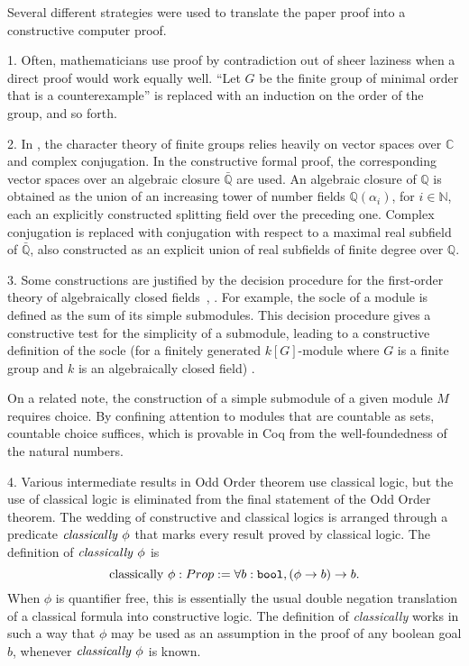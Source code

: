 \documentclass[brochure,english,12pt]{bourbaki}
\theoremstyle{plain}
\def\op#1{{\operatorname{#1}}}
\def\ring#1{{\mathbb{#1}}}
\def\bool{\op{\tt bool}}
\begin{document}
Several different strategies were used to translate the paper proof
into a constructive computer proof.

1.  Often, mathematicians use proof by contradiction out of sheer
laziness when a direct proof would work equally well.  ``Let $G$ be
the finite group of minimal order that is a counterexample'' is
replaced with an induction on the order of the group, and so forth.

2. In \cite{peterfalvi2000character}, the character theory of finite
groups relies heavily on vector spaces over $\ring{C}$ and complex
conjugation.  In the constructive formal proof, the corresponding
vector spaces over an algebraic closure $\bar{\ring{Q}}$ are used.  An
algebraic closure of $\ring{Q}$ is obtained as the union of an
increasing tower of number fields $\ring{Q}(\alpha_i)$, for
$i\in\ring{N}$, each an explicitly constructed splitting field over
the preceding one.  Complex conjugation is replaced with conjugation
with respect to a maximal real subfield of $\bar{\ring{Q}}$, also
constructed as an explicit union of real subfields of finite degree
over $\ring{Q}$.

3.  Some constructions are justified by the decision procedure for the
first-order theory of algebraically closed
fields~\cite{cohen2010formal}, \cite{Ha09}.  For example, the socle of
a module is defined as the sum of its simple submodules.  This
decision procedure gives a constructive test for the simplicity of a
submodule, leading to a constructive definition of the socle (for a
finitely generated $k[G]$-module where $G$ is a finite group and $k$
is an algebraically closed field) \cite{gonthier2011point}.

On a related note, the construction of a simple submodule of a given
module $M$ requires choice.  By confining attention to modules that
are countable as sets, countable choice suffices, which is provable in
Coq from the well-foundedness of the natural numbers.

4.  Various intermediate results in Odd Order theorem use classical
logic, but the use of classical logic is eliminated from the final
statement of the Odd Order theorem.  The wedding of constructive and
classical logics is arranged through a predicate $\op{\it
  classically}~\phi$ that marks every result proved by classical
logic.  The definition of $\op{\it classically}~\phi$ is
\[
\op{classically}~\phi : Prop := \forall {b:\bool}, (\phi\to b) \to b.
\]
When $\phi$ is quantifier free, this is essentially the usual double
negation translation of a classical formula into constructive logic.
The definition of {\it classically} works in such a way that $\phi$
may be used as an assumption in the proof of any boolean goal $b$,
whenever $\op{\it classically}~\phi$ is known.
\end{document}
